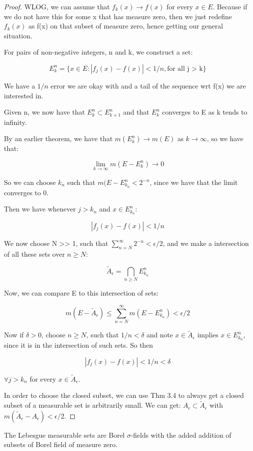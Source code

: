\documentclass[class=article, crop=false]{standalone}
\theoremstyle{definition}
\theoremstyle{remark}
\theoremstyle{lemma}
\theoremstyle{theorem}
\theoremstyle{corollary}
\theoremstyle{property}
\begin{document}
			\begin{proof}
				WLOG, we can assume that $f_k(x) \rightarrow f(x)$ for every $x \in E$. Because if we do not have this for some x that has measure zero, then we just redefine $f_k(x)$ as f(x) on that subset of measure zero, hence getting our general situation.

				For pairs of non-negative integers, n and k, we construct a set:

					$$E_k^n = \{x \in E : |f_j(x) - f(x)| < 1/n, \text{for all j > k}\}$$

				We have a $1/n$ error we are okay with and a tail of the sequence wrt f(x) we are interested in.

				Given n, we now have that $E_k^n \subset E_{k+1}^n$ and that $E_k^n$ converges to E as k tends to infinity. 

				By an earlier theorem, we have that $m(E_k^n) \rightarrow m(E)$ as $k\rightarrow\infty$, so we have that:

					$$\lim_{k\rightarrow\infty} m(E - E_k^n) \rightarrow0$$

				So we can choose $k_n$ such that $m(E - E_{k_n}^n < 2^{-n}$, since we have that the limit converges to 0. 

				Then we have whenever $j > k_n$ and $x \in E_{k_n}^n$:

					$$|f_j(x) - f(x)| < 1/n$$

				We now choose N >> 1, such that $\sum_{n=N}^\infty 2^{-n} < \epsilon /2$, and we make a intersection of all these sets over $n \ge N$:

					$$\tilde{A}_\epsilon = \bigcap_{n \ge N} E_{k_n}^n$$

				Now, we can compare E to this intersection of sets:

					$$m(E - \tilde{A}_\epsilon) \le \sum_{n=N}^\infty m(E - E_{k_n}^n) < \epsilon / 2$$

				Now if $\delta > 0$, choose $n \ge N$, such that $1/n < \delta$ and note $x \in \tilde{A}_\epsilon$ implies $x \in E_{k_n}^n$, since it is in the intersection of such sets. So then 

					$$|f_j(x) - f(x)| < 1/n < \delta$$

				 $\forall j > k_n$ for every $x \in \tilde{A}_\epsilon$.

				 In order to choose the closed subset, we can use Thm 3.4 to always get a closed subset of a measurable set is arbitrarily small. We can get: $A_\epsilon \subset \tilde{A}_\epsilon$ with $m(\tilde{A}_\epsilon - A_\epsilon) < \epsilon / 2$.
			\end{proof}

		The Lebesgue measurable sets are Borel $\sigma$-fields with the added addition of subsets of Borel field of measure zero.
\end{document}
